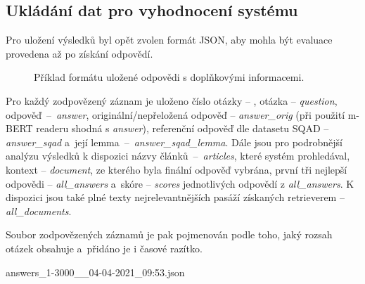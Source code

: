 \subsection{Ukládání dat pro vyhodnocení systému}
Pro uložení výsledků byl opět zvolen formát JSON, aby mohla být evaluace provedena až po získání odpovědí.\par
\begin{figure}[hbt]
	\centering
	\caption{Příklad formátu uložené odpovědi s doplňkovými informacemi.}
	\label{fig:saved_answer}
\end{figure}
Pro každý zodpovězený záznam je uloženo číslo otázky -- , otázka -- \emph{question}, odpověď~--~\emph{answer}, originální/nepřeložená odpověď -- \emph{answer\_orig} (při použití m-BERT readeru shodná s \emph{answer}), referenční odpověď dle datasetu SQAD -- \emph{answer\_sqad} a~její lemma~--~\mbox{\emph{answer\_sqad\_lemma}}. Dále jsou pro podrobnější analýzu výsledků k dispozici názvy článků~--~\emph{articles}, které systém prohledával, kontext -- \emph{document}, ze kterého byla finální odpověď vybrána, první tři nejlepší odpovědi -- \emph{all\_answers} a~skóre -- \emph{scores} jednotlivých odpovědí z \emph{all\_answers}. K dispozici jsou také plné texty nejrelevantnějších pasáží získaných retrieverem -- \emph{all\_documents}.\par
Soubor zodpovězených záznamů je pak pojmenován podle toho, jaký rozsah otázek obsahuje a~přidáno je i časové razítko.
\begin{center}
    answers\_1-3000\_\_04-04-2021\_09:53.json
\end{center}

